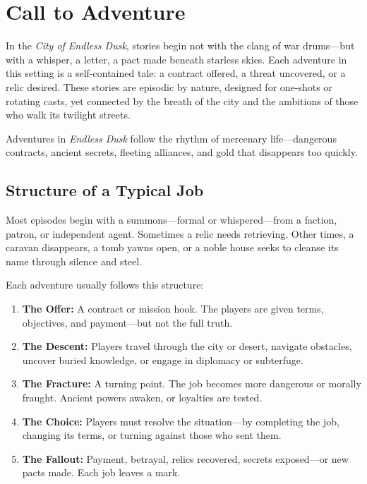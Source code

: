 \section{Call to Adventure}

In the \textit{City of Endless Dusk}, stories begin not with the clang of war drums—but with a whisper, a letter, a pact made beneath starless skies. Each adventure in this setting is a self-contained tale: a contract offered, a threat uncovered, or a relic desired. These stories are episodic by nature, designed for one-shots or rotating casts, yet connected by the breath of the city and the ambitions of those who walk its twilight streets.

Adventures in \textit{Endless Dusk} follow the rhythm of mercenary life—dangerous contracts, ancient secrets, fleeting alliances, and gold that disappears too quickly.

\vspace{0.5\baselineskip}
\subsection*{Structure of a Typical Job}

Most episodes begin with a summons—formal or whispered—from a faction, patron, or independent agent. Sometimes a relic needs retrieving. Other times, a caravan disappears, a tomb yawns open, or a noble house seeks to cleanse its name through silence and steel.

Each adventure usually follows this structure:

\begin{enumerate}
    \item \textbf{The Offer:} A contract or mission hook. The players are given terms, objectives, and payment—but not the full truth.
    
    \item \textbf{The Descent:} Players travel through the city or desert, navigate obstacles, uncover buried knowledge, or engage in diplomacy or subterfuge.

    \item \textbf{The Fracture:} A turning point. The job becomes more dangerous or morally fraught. Ancient powers awaken, or loyalties are tested.

    \item \textbf{The Choice:} Players must resolve the situation—by completing the job, changing its terms, or turning against those who sent them.

    \item \textbf{The Fallout:} Payment, betrayal, relics recovered, secrets exposed—or new pacts made. Each job leaves a mark.
\end{enumerate}

